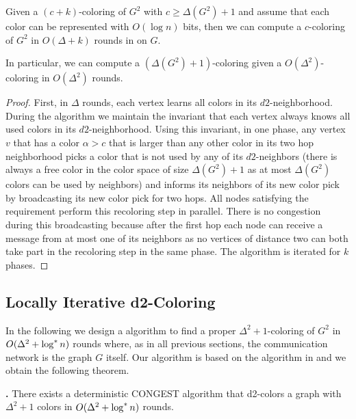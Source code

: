 \begin{theorem}
\label{thm:delta2_simple_color}
Given a $(c+k)$-coloring of $G^2$ with $c\geq \Delta(G^2)+1$ and assume that each color can be represented with $O(\log n)$ bits, then we can compute a $c$-coloring of $G^2$ in $O(\Delta+k)$ rounds in {\congest} on $G$. 

In particular, we can compute a $(\Delta(G^2)+1)$-coloring given a $O(\Delta^2)$-coloring in $O(\Delta^2)$ rounds.
\end{theorem}
\begin{proof}
First, in $\Delta$ rounds, each vertex learns all colors in its $d2$-neighborhood. During the algorithm we maintain the invariant that each vertex always knows all used colors in its $d2$-neighborhood. 
Using this invariant, in one phase, any vertex $v$ that has a color $\alpha>c$ that is larger than any other color in its two hop neighborhood picks a color that is not used by any of its $d2$-neighbors (there is always a free color in the color space of size $\Delta(G^2)+1$ as at most $\Delta(G^2)$ colors can be used by neighbors) and informs its neighbors of its new color pick by broadcasting its new color pick for two hops. All nodes satisfying the requirement perform this recoloring step in parallel. 
There is no congestion during this broadcasting because after the first hop each node can receive a message from at most one of its neighbors as no vertices of distance two can both take part in the recoloring step in the same phase. The algorithm is iterated for $k$ phases.
\end{proof}





\subsection{Locally Iterative d2-Coloring}

In the following we design a {\congest} algorithm to find a proper $\Delta^2+1$-coloring of $G^2$ in $O(\Delta^2+\log^* n)$ rounds where, as in all previous sections, the communication network is the graph $G$ itself.  Our algorithm is based on the algorithm in \cite{BEG18} and we obtain the following theorem.

\medskip
\noindent \textbf{.} 
There exists a deterministic CONGEST algorithm that d2-colors a graph with $\Delta^2+1$ colors in $O(\Delta^2+\log^* n)$ rounds.

\medskip


